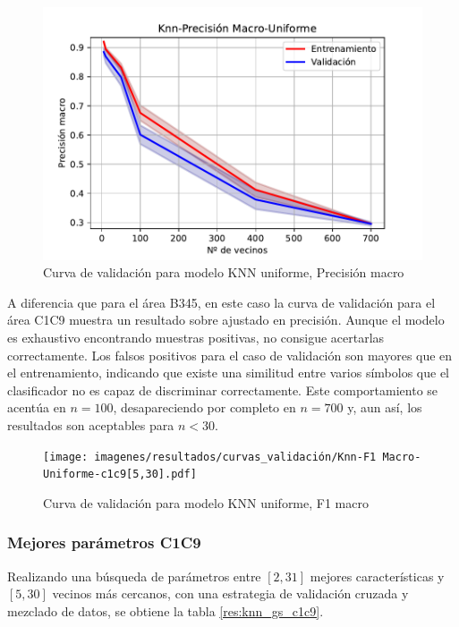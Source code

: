 \begin{figure}[H]
	\centering
	\captionsetup{justification=centering}
	\includegraphics[width=\textwidth]{imagenes/resultados/curvas_validación/Knn-Precisión macro-Uniforme-c1c9.pdf}
	\caption{Curva de validación para modelo KNN uniforme, Precisión macro}
	\label{fig:res_knn_vc_precision_c1c9}
\end{figure}

A diferencia que para el área B345, en este caso la curva de validación para el área C1C9 muestra un resultado sobre ajustado en precisión. Aunque el modelo es exhaustivo encontrando muestras positivas, no consigue acertarlas correctamente. Los falsos positivos para el caso de validación son mayores que en el entrenamiento, indicando que existe una similitud entre varios símbolos que el clasificador no es capaz de discriminar correctamente. Este comportamiento se acentúa en $n=100$, desapareciendo por completo en $n=700$ y, aun así, los resultados son aceptables para $n<30$.

\begin{figure}[H]
	\centering
	\captionsetup{justification=centering}
	\texttt{[image: imagenes/resultados/curvas\_validación/Knn-F1 Macro-Uniforme-c1c9[5,30].pdf]}
	\caption{Curva de validación para modelo KNN uniforme, F1 macro}
	\label{fig:res_knn_vc_precision_c1c9[5,30]}
\end{figure}

\subsubsection{Mejores parámetros C1C9}

Realizando una búsqueda de parámetros entre $[2,31]$ mejores características y $[5,30]$ vecinos más cercanos, con una estrategia de validación cruzada y mezclado de datos, se obtiene la tabla \ref{res:knn_gs_c1c9}.

